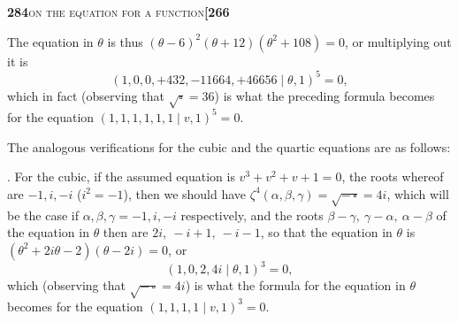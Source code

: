 \documentclass[11pt]{article}
\newcommand{\Cdel}{\mid}
\begin{document}
\newpage
\setcounter{page}{284}

\noindent\textbf{284}\hfill\textsc{on the equation for a function}\hfill\textbf{[266}

\medskip

\noindent The equation in $\theta$ is thus $(\theta - 6)^2(\theta + 12)(\theta^2 + 108) = 0$, or multiplying out it is
\[
   (1, 0, 0, +432, -11664, +46656 \Cdel \theta, 1)^5 = 0,
\]
which in fact (observing that $\sqrt{\square} = 36$) is what the preceding formula becomes for the equation $(1, 1, 1, 1, 1, 1 \Cdel v, 1)^5 = 0$.

\medskip

\noindent The analogous verifications for the cubic and the quartic equations are as follows:

\medskip

. For the cubic, if the assumed equation is $v^3 + v^2 + v + 1 = 0$, the roots whereof are $-1, i, -i$ ($i^2 = -1$), then we should have $\zeta^4(\alpha, \beta, \gamma) = \sqrt{-\,\square} = 4i$, which will be the case if $\alpha, \beta, \gamma = -1, i, -i$ respectively, and the roots $\beta - \gamma,\ \gamma - \alpha,\ \alpha - \beta$ of the equation in $\theta$ then are $2i,\ -i + 1,\ -i - 1$, so that the equation in $\theta$ is $(\theta^2 + 2i\theta - 2)(\theta - 2i) = 0$, or
\[
   (1, 0, 2, 4i \Cdel \theta, 1)^3 = 0,
\]
which (observing that $\sqrt{-\,\square} = 4i$) is what the formula for the equation in $\theta$ becomes for the equation $(1, 1, 1, 1 \Cdel v, 1)^3 = 0$.

\medskip
\end{document}

